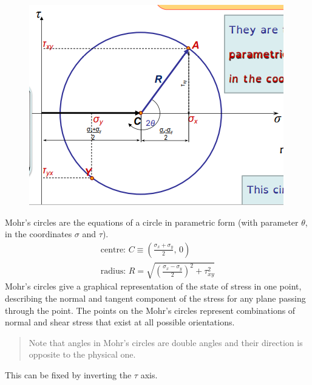 \documentclass[class=report, crop=false, 12pt,a4paper]{standalone}
\begin{document}
\begin{figure}[H]
    \centering
    \includegraphics[height = 0.2 \textheight]{../img/diagram48.png}
    \caption{}
\end{figure}
Mohr's circles are the equations of a circle in parametric form (with parameter $\theta$, in the coordinates $\sigma$ and $\tau$).
\begin{gather}
    \textrm{centre: } C \equiv \left(\frac{\sigma_x + \sigma_y}{2}, \, 0\right)\\
    \textrm{radius: } R = \sqrt{\left(\frac{\sigma_x - \sigma_y}{2}\right)^2 + \tau^2_{xy}}
\end{gather}
Mohr's circles give a graphical representation of the state of stress in one point, describing the normal and tangent component of the stress for any plane passing through the point. The points on the Mohr's circles represent combinations of normal and shear stress that exist at all possible orientations. 
\begin{quotation}
    Note that angles in Mohr's circles are double angles and their direction is opposite to the physical one.
\end{quotation}
This can be fixed by inverting the $\tau$ axis.
\end{document}
